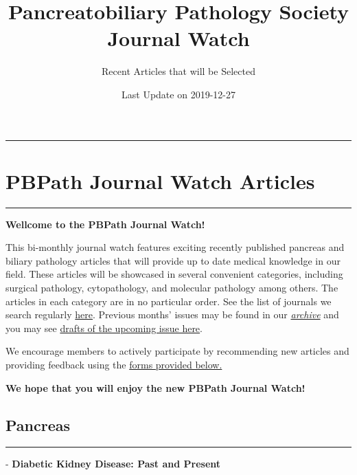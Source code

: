 \documentclass[
]{article}
\title{Pancreatobiliary Pathology Society Journal Watch}
\subtitle{Recent Articles that will be Selected}
\author{}
\date{\vspace{-2.5em}Last Update on 2019-12-27}
\renewcommand{\linethickness}{0.05em}
\begin{document}
\maketitle

{
\setcounter{tocdepth}{2}
\tableofcontents
}
\begin{center}\rule{0.5\linewidth}{\linethickness}\end{center}

\hypertarget{pbpath_jw}{%
\section{PBPath Journal Watch Articles}\label{pbpath_jw}}

\begin{center}\rule{0.5\linewidth}{\linethickness}\end{center}

\textbf{Wellcome to the PBPath Journal Watch!}

This bi-monthly journal watch features exciting recently published
pancreas and biliary pathology articles that will provide up to date
medical knowledge in our field. These articles will be showcased in
several convenient categories, including surgical pathology,
cytopathology, and molecular pathology among others. The articles in
each category are in no particular order. See the list of journals we
search regularly \href{http://pbpath.org/pbpath-journal-watch/}{here}.
Previous months' issues may be found in our
\emph{\href{http://pbpath.org/journal-watch-archive/}{archive}} and you
may see \href{http://pbpath.org/journal-watch-upcoming-issue/}{drafts of
the upcoming issue here}.

We encourage members to actively participate by recommending new
articles and providing feedback using the
\protect\hyperlink{feedback}{forms provided below.}

\textbf{We hope that you will enjoy the new PBPath Journal Watch!}

\pagebreak

\hypertarget{pancreas}{%
\subsection{Pancreas}\label{pancreas}}

\begin{center}\rule{0.5\linewidth}{\linethickness}\end{center}

- \textbf{Diabetic Kidney Disease: Past and Present}
\end{document}
